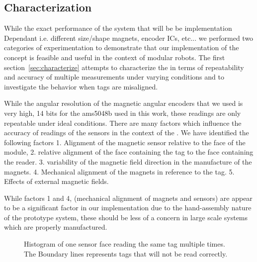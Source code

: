\subsection{\tagNamePlural Characterization}
\label{sec:tagsCharacterize}

While the exact performance of the \tagName system that will be be implementation Dependant i.e. different size/shape magnets, encoder ICs, etc... we performed two categories of experimentation to demonstrate that our implementation of the \tagName concept is feasible and useful in the context of modular robots. The first section~\ref{sec:characterize} attempts to characterize the \tagNamePlural in terms of repeatability and accuracy of multiple measurements under varying conditions and to investigate the behavior when tags are misaligned. 

While the angular resolution of the magnetic angular encoders that we used is very high, 14 bits for the ams5048b used in this work, these readings are only repeatable under ideal conditions. There are many factors which influence the accuracy of readings of the sensors in the context of the \tagNamePlural. We have identified the following factors 1. Alignment of the magnetic sensor relative to the face of the module, 2. relative alignment of the face containing the tag to the face containing the reader. 3. variability of the magnetic field direction in the manufacture of the magnets. 4. Mechanical alignment of the magnets in reference to the tag. 5. Effects of external magnetic fields.

While factors 1 and 4, (mechanical alignment of magnets and sensors) are appear to be a significant factor in our implementation due to the hand-assembly nature of the prototype system, these should be less of a concern in large scale systems which are properly manufactured.

\begin{figure}[h]
	
	\caption{Histogram of one sensor face reading the same tag multiple times. The Boundary lines represents tags that will not be read correctly.}
	\label{fig:histogram}
\end{figure}


%	
